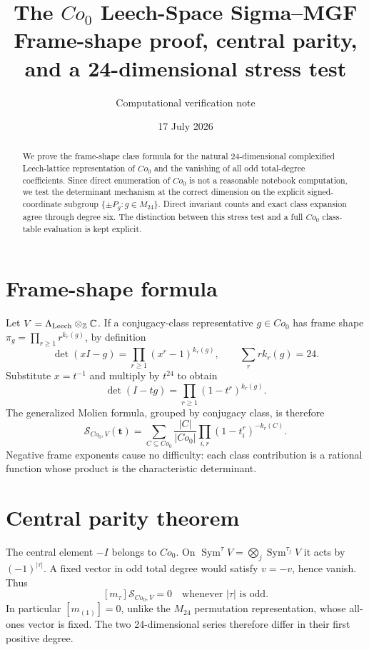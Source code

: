 \documentclass[11pt]{article}
\title{\color{navy}\bfseries The $Co_0$ Leech-Space Sigma--MGF\\
\large Frame-shape proof, central parity, and a 24-dimensional stress test}
\author{Computational verification note}\date{17 July 2026}
\newcommand{\Sgm}{\mathcal S}
\begin{document}
\maketitle

\begin{abstract}
We prove the frame-shape class formula for the natural $24$-dimensional
complexified Leech-lattice representation of $Co_0$ and the vanishing of all
odd total-degree coefficients.  Since direct enumeration of $Co_0$ is not a
reasonable notebook computation, we test the determinant mechanism at the
correct dimension on the explicit signed-coordinate subgroup
$\{\pm P_g:g\in M_{24}\}$.  Direct invariant counts and exact class expansion
agree through degree six.  The distinction between this stress test and a
full $Co_0$ class-table evaluation is kept explicit.
\end{abstract}

\section{Frame-shape formula}
Let $V=\Lambda_{\rm Leech}\otimes_{\mathbb Z}\mathbb C$.  If a conjugacy-class
representative $g\in Co_0$ has frame shape
$\pi_g=\prod_{r\geq1}r^{k_r(g)}$, by definition
\[
\det(xI-g)=\prod_{r\geq1}(x^r-1)^{k_r(g)},\qquad
\sum_r r k_r(g)=24.
\]
Substitute $x=t^{-1}$ and multiply by $t^{24}$ to obtain
\[
\det(I-tg)=\prod_{r\geq1}(1-t^r)^{k_r(g)}.
\]
The generalized Molien formula, grouped by conjugacy class, is therefore
\begin{equation}\label{eq:co0}
\boxed{\Sgm_{Co_0,V}(\mathbf t)=
\sum_{C\subseteq Co_0}\frac{|C|}{|Co_0|}
\prod_{i,r}(1-t_i^r)^{-k_r(C)}.}
\end{equation}
Negative frame exponents cause no difficulty: each class contribution is a
rational function whose product is the characteristic determinant.

\section{Central parity theorem}
The central element $-I$ belongs to $Co_0$.  On
$\operatorname{Sym}^{\tau}V=\bigotimes_j\operatorname{Sym}^{\tau_j}V$ it
acts by $(-1)^{|\tau|}$.  A fixed vector in odd total degree would satisfy
$v=-v$, hence vanish.  Thus
\begin{equation}\label{eq:parity}
\boxed{[m_\tau]\Sgm_{Co_0,V}=0\quad\text{whenever }|\tau|\text{ is odd}.}
\end{equation}
In particular $[m_{(1)}]=0$, unlike the $M_{24}$ permutation representation,
whose all-ones vector is fixed.  The two 24-dimensional series therefore
differ in their first positive degree.
\end{document}
